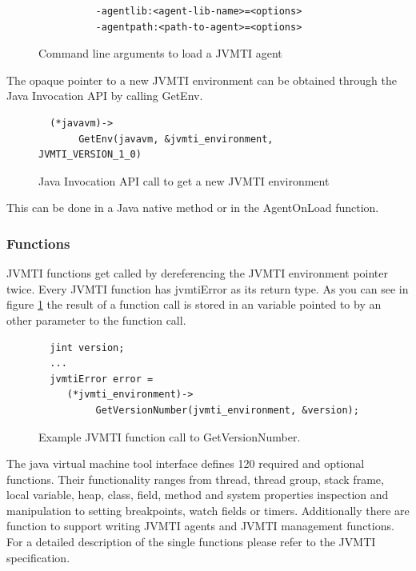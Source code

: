 \begin{figure}[h]
\begin{verbatim}
          -agentlib:<agent-lib-name>=<options>
          -agentpath:<path-to-agent>=<options>
\end{verbatim}
\caption{Command line arguments to load a JVMTI agent}
\end{figure}

The opaque pointer to a new JVMTI environment can be obtained through the Java Invocation API by calling GetEnv.

\begin{figure}[h]
\begin{verbatim}
  (*javavm)->
       GetEnv(javavm, &jvmti_environment, JVMTI_VERSION_1_0)
\end{verbatim}
\caption{Java Invocation API call to get a new JVMTI environment}
\end{figure}

This can be done in a Java native method or in the AgentOnLoad function.

\subsubsection{Functions}
\label{jvmtifunctions}
JVMTI functions get called by dereferencing the JVMTI environment pointer twice. Every JVMTI function has jvmtiError as its return type. As you can see in figure \ref{functioncall} the result of a function call is stored in an variable pointed to by an other parameter to the function call.

\begin{figure}[h]
\begin{verbatim}
  jint version;
  ...
  jvmtiError error = 
     (*jvmti_environment)->
          GetVersionNumber(jvmti_environment, &version);
\end{verbatim}
\caption{Example JVMTI function call to GetVersionNumber.}
\label{functioncall}
\end{figure}

The java virtual machine tool interface defines 120 required and optional functions. Their functionality ranges from thread, thread group, stack frame, local variable, heap, class, field, method and system properties inspection and manipulation to setting breakpoints, watch fields or timers. Additionally there are function to support writing JVMTI agents and JVMTI management functions. For a detailed description of the single functions please refer to the JVMTI specification\cite{jvmti}.

